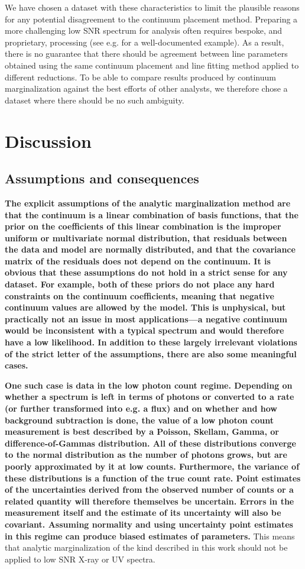 \documentclass[manuscript]{aastex62}
\begin{document}
{We have chosen a dataset with these characteristics to limit the plausible reasons for any potential disagreement to the continuum placement method.
Preparing a more challenging low SNR spectrum for analysis often requires bespoke, and proprietary, processing (see e.g. \citealt{Wakker:2015} for a well-documented example).
As a result, there is no guarantee that there should be agreement between line parameters obtained using the same continuum placement and line fitting method applied to different reductions.
To be able to compare results produced by continuum marginalization against the best efforts of other analysts, we therefore chose a dataset where there should be no such ambiguity.
}


\section{Discussion}
\label{sec:discussion}
\subsection{Assumptions and consequences}
{\bf
The explicit assumptions of the analytic marginalization method are that the continuum is a linear combination of basis functions, that the prior on the coefficients of this linear combination is the improper uniform or multivariate normal distribution, that residuals between the data and model are normally distributed, and that the covariance matrix of the residuals does not depend on the continuum.
It is obvious that these assumptions do not hold in a strict sense for any dataset.
For example, both of these priors do not place any hard constraints on the continuum coefficients, meaning that negative continuum values are allowed by the model.
This is unphysical, but practically not an issue in most applications---a negative continuum would be inconsistent with a typical spectrum and would therefore have a low likelihood.
In addition to these largely irrelevant violations of the strict letter of the assumptions, there are also some meaningful cases.
}

{\bf
One such case is data in the low photon count regime.
Depending on whether a spectrum is left in terms of photons or converted to a rate (or further transformed into e.g. a flux) and on whether and how background subtraction is done, the value of a low photon count measurement is best described by a Poisson, Skellam, Gamma, or difference-of-Gammas distribution.
All of these distributions converge to the normal distribution as the number of photons grows, but are poorly approximated by it at low counts.
Furthermore, the variance of these distributions is a function of the true count rate.
Point estimates of the uncertainties derived from the observed number of counts or a related quantity will therefore themselves be uncertain.
Errors in the measurement itself and the estimate of its uncertainty will also be covariant.
Assuming normality and using uncertainty point estimates in this regime can produce biased estimates of parameters.
}
This means that analytic marginalization of the kind described in this work should not be applied to low SNR X-ray or UV spectra.
\end{document}
